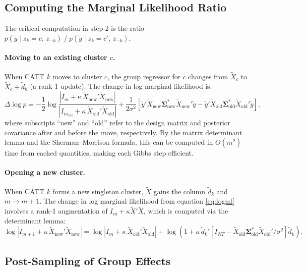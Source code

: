 \documentclass[12pt]{article}
\newcommand{\1}{\mathbbm{1}}
\newcommand{\ytd}{\tilde{y}}
\newcommand{\dtd}{\tilde{d}}
\newcommand{\Xtd}{\tilde{X}}
\begin{document}
\subsection{Computing the Marginal Likelihood Ratio}

The critical computation in step 2 is the ratio
$p(\ytd\mid z_k = c,\, z_{-k})\;/\;p(\ytd\mid z_k = c',\, z_{-k})$.

\paragraph{Moving to an existing cluster $c$.}
When CATT $k$ moves to cluster $c$, the group regressor for $c$ changes from
$\Xtd_c$ to $\Xtd_c + \dtd_k$ (a rank-1 update). The change in log marginal
likelihood is:
\begin{equation}
  \Delta\log p = -\frac{1}{2}\log\frac{|I_{m} + \kappa\,\Xtd_{\mathrm{new}}'\Xtd_{\mathrm{new}}|}{|I_{m_{\mathrm{old}}} + \kappa\,\Xtd_{\mathrm{old}}'\Xtd_{\mathrm{old}}|}
  + \frac{1}{2\sigma^2}\left[\ytd'\Xtd_{\mathrm{new}}\bm{\Sigma}_{\mathrm{new}}^*\Xtd_{\mathrm{new}}'\ytd - \ytd'\Xtd_{\mathrm{old}}\bm{\Sigma}_{\mathrm{old}}^*\Xtd_{\mathrm{old}}'\ytd\right],
  \label{eq:delta_lml}
\end{equation}
where subscripts ``new'' and ``old'' refer to the design matrix and posterior
covariance after and before the move, respectively. By the matrix determinant
lemma and the Sherman--Morrison formula, this can be computed in
$O(m^2)$ time from cached quantities, making each Gibbs step efficient.

\paragraph{Opening a new cluster.}
When CATT $k$ forms a new singleton cluster, $\Xtd$ gains the column $\dtd_k$
and $m\to m+1$. The change in log marginal likelihood from equation
\eqref{eq:logml} involves a rank-1 augmentation of $I_m + \kappa\Xtd'\Xtd$,
which is computed via the determinant lemma:
\begin{equation}
  \log|I_{m+1} + \kappa\,\Xtd_{\mathrm{new}}'\Xtd_{\mathrm{new}}| =
    \log|I_m + \kappa\,\Xtd_{\mathrm{old}}'\Xtd_{\mathrm{old}}|
    + \log\!\left(1 + \kappa\,\dtd_k'\!\left[I_{NT} - \Xtd_{\mathrm{old}}\bm{\Sigma}_{\mathrm{old}}^*\Xtd_{\mathrm{old}}'/\sigma^2\right]\!\dtd_k\right).
\end{equation}

\subsection{Post-Sampling of Group Effects}
\end{document}
